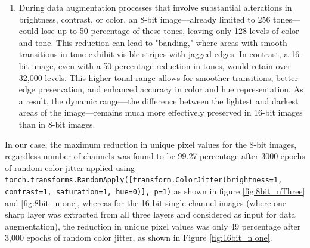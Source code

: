 \begin{enumerate}
\item During data augmentation processes that involve substantial alterations in brightness, contrast, or color, an 8-bit image—already limited to 256 tones—could lose up to 50 percentage of these tones, leaving only 128 levels of color and tone. This reduction can lead to "banding," where areas with smooth transitions in tone exhibit visible stripes with jagged edges. In contrast, a 16-bit image, even with a 50 percentage reduction in tones, would retain over 32,000 levels. This higher tonal range allows for smoother transitions, better edge preservation, and enhanced accuracy in color and hue representation. As a result, the dynamic range—the difference between the lightest and darkest areas of the image—remains much more effectively preserved in 16-bit images than in 8-bit images.
\end{enumerate}
In our case, the maximum reduction in unique pixel values for the 8-bit images, regardless number of channels was found to be 99.27 percentage after 3000 epochs of random
color jitter applied  using \texttt{torch.transforms.RandomApply([transform.ColorJitter(brightness=1, contrast=1, saturation=1, hue=0)], p=1)} 
as shown in figure \ref{fig:8bit_nThree} and \ref{fig:8bit_n one}, whereas for the 16-bit single-channel images (where one sharp layer was extracted from all three layers and considered as input for data augmentation), the reduction in unique pixel values was only 49 percentage after 3,000 epochs of random color jitter, as shown in Figure \ref{fig:16bit_n one}.



